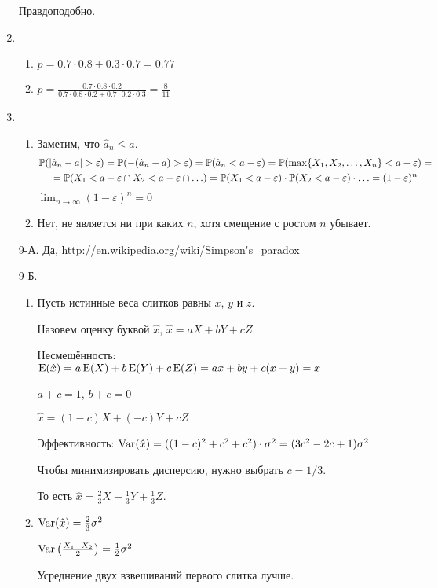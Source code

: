 \begin{enumerate}
Правдоподобно.
\item
\begin{enumerate}
\item $p=0.7\cdot 0.8+ 0.3\cdot 0.7=0.77$
\item $p=\frac{0.7\cdot0.8\cdot0.2}{0.7\cdot 0.8\cdot 0.2 + 0.7\cdot 0.2 \cdot 0.3}=\frac{8}{11}$
\end{enumerate}
\item
\begin{enumerate}
\item Заметим, что $\hat{a}_{n}\leq a$.
\begin{multline*}
\P(|\hat{a}_{n}-a|>\varepsilon)=\P(-(\hat{a}_{n}-a)>\varepsilon)=\P(\hat{a}_{n}<a-\varepsilon)=
\P(\max\{X_{1},X_{2}, \ldots, X_{n}\}<a-\varepsilon)= \\
=\P(X_{1}<a-\varepsilon \cap X_{2}< a-\varepsilon\cap \ldots)=
\P(X_{1}<a-\varepsilon)\cdot \P(X_{2}<a-\varepsilon)\cdot \ldots=(1-\varepsilon)^{n}
\end{multline*}
$\lim_{n\to\infty} (1-\varepsilon)^{n} =0$
\item Нет, не является ни при каких $n$, хотя смещение с ростом $n$ убывает.
\end{enumerate}
\item[9-А.] Да, \url{http://en.wikipedia.org/wiki/Simpson's_paradox}
\item[9-Б.]
\begin{enumerate}
\item Пусть истинные веса слитков равны $x$, $y$ и $z$.

Назовем оценку буквой $\hat{x}$, $\hat{x}=aX+bY+cZ$.

Несмещённость: $\operatorname{E}(\hat{x})=a\operatorname{E}(X)+b\operatorname{E}(Y)+c\operatorname{E}(Z)=ax+by+c(x+y)=x$

$a+c=1$, $b+c=0$

$\hat{x}=(1-c)X+(-c)Y+cZ$

Эффективность: $\operatorname{Var}(\hat{x})=((1-c)^{2}+c^{2}+c^{2})\cdot \sigma^{2}=(3c^{2}-2c+1)\sigma^{2}$

Чтобы минимизировать дисперсию, нужно выбрать $c=1/3$.

То есть $\hat{x}=\frac{2}{3}X-\frac{1}{3}Y+\frac{1}{3}Z$.
\item $\operatorname{Var}(\hat{x})=\frac{2}{3}\sigma^{2}$

$\operatorname{Var}\left(\frac{X_{1}+X_{2}}{2}\right)=\frac{1}{2}\sigma^{2}$

Усреднение двух взвешиваний первого слитка лучше.
\end{enumerate}
\end{enumerate}



